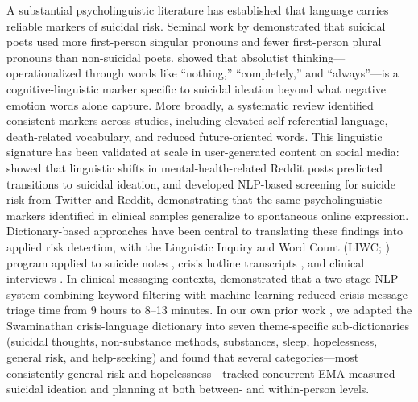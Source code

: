 \documentclass[review,12pt,authoryear]{elsarticle}
\begin{document}
A substantial psycholinguistic literature has established that language carries reliable markers of suicidal risk. Seminal work by \citet{stirman2001word} demonstrated that suicidal poets used more first-person singular pronouns and fewer first-person plural pronouns than non-suicidal poets. \citet{almosaiwi2018absolute} showed that absolutist thinking---operationalized through words like ``nothing,'' ``completely,'' and ``always''---is a cognitive-linguistic marker specific to suicidal ideation beyond what negative emotion words alone capture. More broadly, a systematic review \citep{ophir2022linguistic} identified consistent markers across studies, including elevated self-referential language, death-related vocabulary, and reduced future-oriented words. This linguistic signature has been validated at scale in user-generated content on social media: \citet{dechoudhury2016shifts} showed that linguistic shifts in mental-health-related Reddit posts predicted transitions to suicidal ideation, and \citet{coppersmith2018nlp} developed NLP-based screening for suicide risk from Twitter and Reddit, demonstrating that the same psycholinguistic markers identified in clinical samples generalize to spontaneous online expression. Dictionary-based approaches have been central to translating these findings into applied risk detection, with the Linguistic Inquiry and Word Count (LIWC; \citealt{pennebaker2015development}) program applied to suicide notes \citep{pestian2012sentiment}, crisis hotline transcripts \citep{huang2024mindsets}, and clinical interviews \citep{tausczik2010psychological}. In clinical messaging contexts, \citet{swaminathan2023nlp} demonstrated that a two-stage NLP system combining keyword filtering with machine learning reduced crisis message triage time from 9 hours to 8--13 minutes. In our own prior work \citep{ammerman2025dictionary}, we adapted the Swaminathan crisis-language dictionary \citep{swaminathan2023nlp} into seven theme-specific sub-dictionaries (suicidal thoughts, non-substance methods, substances, sleep, hopelessness, general risk, and help-seeking) and found that several categories---most consistently general risk and hopelessness---tracked concurrent EMA-measured suicidal ideation and planning at both between- and within-person levels.
\end{document}
